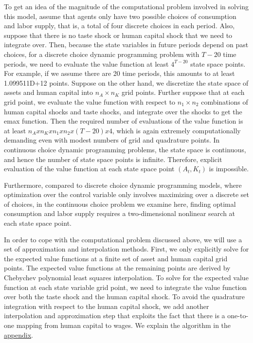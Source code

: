 \documentclass{article}
\begin{document}
To get an idea of the magnitude of the computational problem involved in solving this model, assume that agents only have two possible choices of consumption and labor supply, that is, a total of four discrete choices in each period. Also, suppose that there is no taste shock or human capital shock that we need to integrate over. Then, because the state variables in future periods depend on past choices, for a discrete choice dynamic programming problem with $T - 20$ time periods, we need to evaluate the value function at least $4^{T-20}$ state space points. For example, if we assume there are 20 time periods, this amounts to at least 1.099511D+12 points. Suppose on the other hand, we discretize the state space of assets and human capital into $n_A \times n_K$ grid points. Further suppose that at each grid point, we evaluate the value function with respect to $n_1 \times n_2$ combinations of human capital shocks and taste shocks, and integrate over the shocks to get the emax function. Then the required number of evaluations of the value function is at least $n_A x n_K x n_1 x n_2 x (T - 20) x 4$, which is again extremely computationally demanding even with modest numbers of grid and quadrature points. In continuous choice dynamic programming problems, the state space is continuous, and hence the number of state space points is infinite. Therefore, explicit evaluation of the value function at each state space point $(A_t, K_t)$ is impossible. \par
Furthermore, compared to discrete choice dynamic programming models, where optimization over the control variable only involves maximizing over a discrete set of choices, in the continuous choice problem we examine here, finding optimal consumption and labor supply requires a two-dimensional nonlinear
 search at each state space point. \par
In order to cope with the computational problem discussed above, we will use a set of approximation and interpolation methods. First, we only explicitly solve for the expected value functions at a finite set of asset and human capital grid points. The expected value functions at the remaining points are derived by Chebychev polynomial least squares interpolation. To solve for the expected value function at each state variable grid point, we need to integrate the value function over both the taste shock and the human capital shock. To avoid the quadrature integration with respect to the human capital shock, we add another interpolation and approximation step that exploits the fact that there is a one-to-one mapping from human capital to wages. We explain the algorithm in the \hyperref[appendix]{appendix}. 
\end{document}
